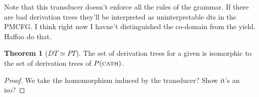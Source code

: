 \documentclass[12pt]{article}
\theoremstyle{definition}
\newtheorem{definition}{Definition}[section]
\newtheorem{thm}{Theorem}[section]
\begin{document}
Note that this transducer doesn't enforce all the rules of the grammar. If there are bad derivation trees they'll be interpreted as uninterpretable dts in the PMCFG. I think right now I havne't distinguished the co-domain from the yield. Haffoo do that.












\begin{thm}[$DT \simeq PT$]
  The set of derivation trees for a given \OURG is isomorphic to the set of derivation trees of $P(\text{\textsc{cath}})$.
\end{thm}

\begin{proof}
  We take the homomorphism induced by the transducer? Show it's an iso?
  
\end{proof}
\end{document}
